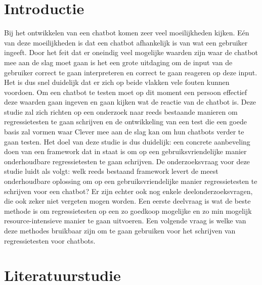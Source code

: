 
\section{Introductie} %
\label{sec:introductie}

Bij het ontwikkelen van een chatbot komen zeer veel moeilijkheden kijken. Eén van deze moeilijkheden is dat een chatbot afhankelijk is van wat een gebruiker ingeeft. Door het feit dat er oneindig veel mogelijke waarden zijn waar de chatbot mee aan de slag moet gaan is het een grote uitdaging om de input van de gebruiker correct te gaan interpreteren en correct te gaan reageren op deze input. Het is dus snel duidelijk dat er zich op beide vlakken vele fouten kunnen voordoen. Om een chatbot te testen moet op dit moment een persoon effectief deze waarden gaan ingeven en gaan kijken wat de reactie van de chatbot is. Deze studie zal zich richten op een onderzoek naar reeds bestaande manieren om regressietesten te gaan schrijven en de ontwikkeling van een test die een goede basis zal vormen waar Clever mee aan de slag kan om hun chatbots verder te gaan testen. Het doel van deze studie is dus duidelijk: een concrete aanbeveling doen van een framework dat in staat is om op een gebruiksvriendelijke manier onderhoudbare regressietesten te gaan schrijven. De onderzoeksvraag voor deze studie luidt als volgt: welk reeds bestaand framework levert de meest onderhoudbare oplossing om op een gebruiksvriendelijke manier regressietesten te schrijven voor een chatbot? Er zijn echter ook nog enkele deelonderzoeksvragen, die ook zeker niet vergeten mogen worden. Een eerste deelvraag is wat de beste methode is om regressietesten op een zo goedkoop mogelijke en zo min mogelijk resource-intensieve manier te gaan uitvoeren. Een volgende vraag is welke van deze methodes bruikbaar zijn om te gaan gebruiken voor het schrijven van regressietesten voor chatbots. 


\section{Literatuurstudie}
\label{sec:literatuurstudie}

